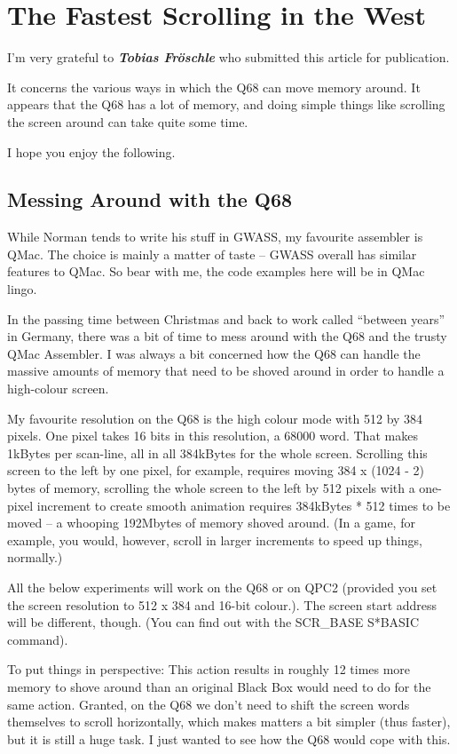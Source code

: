 \chapter{The Fastest Scrolling in the West}

I'm very grateful to \textbf{\textit{Tobias Fröschle}} who submitted this article for publication.

It concerns the various ways in which the Q68 can move memory around. It appears that the Q68 has a lot of memory, and doing simple things like scrolling the screen around can take quite some time.

I hope you enjoy the following.


\section{Messing Around with the Q68}

While Norman tends to write his stuff in GWASS, my favourite assembler is
QMac. The choice is mainly a matter of taste -- GWASS overall has
similar features to QMac. So bear with me, the code examples here will
be in QMac lingo.

In the passing time between Christmas and back to work called ``between
years'' in Germany, there was a bit of time to mess around with the Q68
and the trusty QMac Assembler. I was always a bit concerned how the Q68
can handle the massive amounts of memory that need to be shoved around
in order to handle a high-colour screen.

My favourite resolution on the Q68 is the high colour mode with 512 by 384
pixels. One pixel takes 16 bits in this resolution, a 68000 word. That
makes 1kBytes per scan-line, all in all 384kBytes for the whole screen.
Scrolling this screen to the left by one pixel, for example, requires
moving 384 x (1024 - 2) bytes of memory, scrolling the whole screen to
the left by 512 pixels with a one-pixel increment to create smooth
animation requires 384kBytes * 512 times to be moved -- a whooping
192Mbytes of memory shoved around. (In a game, for example, you would,
however, scroll in larger increments to speed up things, normally.)

All the below experiments will work on the Q68 or on QPC2 (provided you
set the screen resolution to 512 x 384 and 16-bit colour.). The screen
start address will be different, though. (You can find out with the
SCR\_BASE S*BASIC command).

To put things in perspective: This action results in roughly 12 times
more memory to shove around than an original Black Box would need to do
for the same action. Granted, on the Q68 we don't need to shift the
screen words themselves to scroll horizontally, which makes matters a
bit simpler (thus faster), but it is still a huge task. I just wanted to
see how the Q68 would cope with this.

